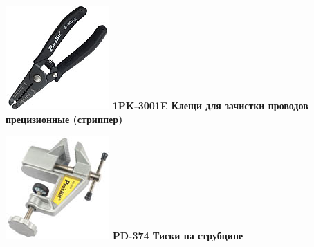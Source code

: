 \documentclass{magazine}
\begin{document}
{\begin{multicols}{2}
\noindent\includegraphics[width=\columnwidth]{fig/00/pros/1PK-3001E.jpg}
\textbf{1PK-3001E Клещи для зачистки проводов прецизионные (стриппер)}

\noindent\includegraphics[width=\columnwidth]{fig/00/pros/PD-374.jpg}
\textbf{PD-374 Тиски на струбцине}


\end{multicols}}
\end{document}
